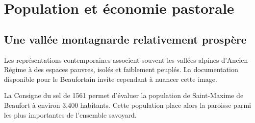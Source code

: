 \documentclass[12pt,a4paper]{report}
\begin{document}
\section{Population et économie pastorale}

\subsection{Une vallée montagnarde relativement prospère}

Les représentations contemporaines associent souvent les vallées alpines d'Ancien Régime à des espaces pauvres, isolés et faiblement peuplés. La documentation disponible pour le Beaufortain invite cependant à nuancer cette image.

La Consigne du sel de 1561 permet d'évaluer la population de Saint-Maxime de Beaufort à environ 3,400 habitants. Cette population place alors la paroisse parmi les plus importantes de l'ensemble savoyard. 
\end{document}
